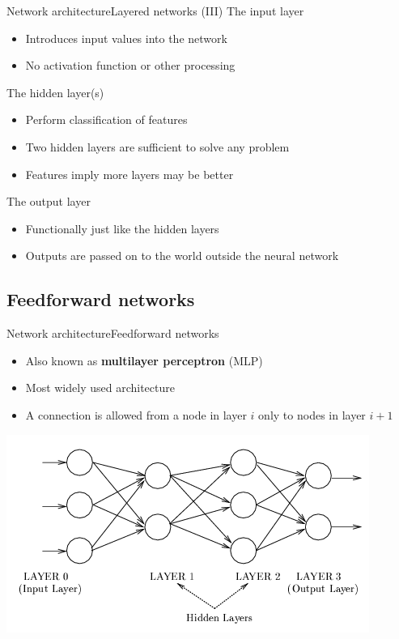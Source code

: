 \documentclass[10pt,compress]{beamer} %
\begin{document}
\begin{frame}{Network architecture}{Layered networks (III)}
	The input layer
	\begin{itemize}
	\item Introduces input values into the network
	\item No activation function or other processing
	\end{itemize}
	The hidden layer(s)
	\begin{itemize}
	\item Perform classification of features
	\item Two hidden layers are sufficient to solve any problem
	\item Features imply more layers may be better
	\end{itemize}
	The output layer
	\begin{itemize}
	\item Functionally just like the hidden layers
	\item Outputs are passed on to the world outside the neural network
	\end{itemize}
\end{frame}

\subsection{Feedforward networks}
\begin{frame}{Network architecture}{Feedforward networks}
		\begin{itemize}
		\item Also known as \textbf{multilayer perceptron} (MLP)
		\item Most widely used architecture
		\item A connection is allowed from a node in layer $i$ only to nodes in layer $i + 1$
		\end{itemize}

 \begin{center}
	\includegraphics[width=0.6\linewidth]{figs/ff.png}
 \end{center}
\end{frame}
\end{document}
